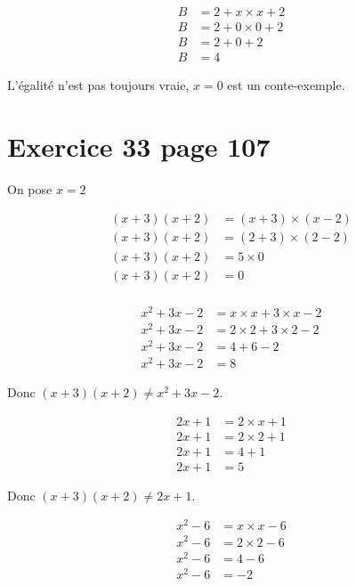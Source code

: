\documentclass[12pt,a4paper]{article}
\begin{document}
\begin{enumerate}
\begin{multicols}{2}
		\begin{align*}
			B &= 2 + x \times x + 2\\
			B &= 2 + 0 \times 0 + 2\\
			B &= 2 + 0 + 2\\
			B &= 4
		\end{align*}
		
		
	\end{multicols}
	L'égalité n'est pas toujours vraie, $x=0$ est un conte-exemple.
\end{enumerate}

\section*{Exercice 33 page 107}

On pose $x=2$

\begin{align*}
	(x +3)(x+2) &= (x + 3) \times (x - 2)\\
	(x +3)(x+2) &= (2 + 3) \times (2 - 2)\\
	(x +3)(x+2) &= 5 \times 0\\
	(x +3)(x+2) &= 0\\
\end{align*}

	\begin{align*}
		x^2 + 3x -2 &= x \times x + 3 \times x -2 \\
		x^2 + 3x -2 &= 2 \times 2 + 3 \times 2 -2 \\
		x^2 + 3x -2 &= 4 + 6 -2 \\
		x^2 + 3x -2 &= 8		
	\end{align*}
	
	Donc $(x +3)(x+2) \neq x^2 + 3x -2$.
	
	
	\begin{align*}
		2x + 1 &= 2 \times x + 1 \\
		2x + 1 &= 2 \times 2 + 1 \\
		2x + 1 &= 4 + 1 \\
		2x + 1 &= 5
	\end{align*}
	
	Donc $(x +3)(x+2) \neq 2x+1$.
	
	\begin{align*}
		x^2 - 6 &= x \times x - 6 \\
		x^2 - 6 &= 2 \times 2 - 6 \\
		x^2 - 6 &= 4 - 6 \\
		x^2 - 6 &= -2
	\end{align*}
	
\end{document}
